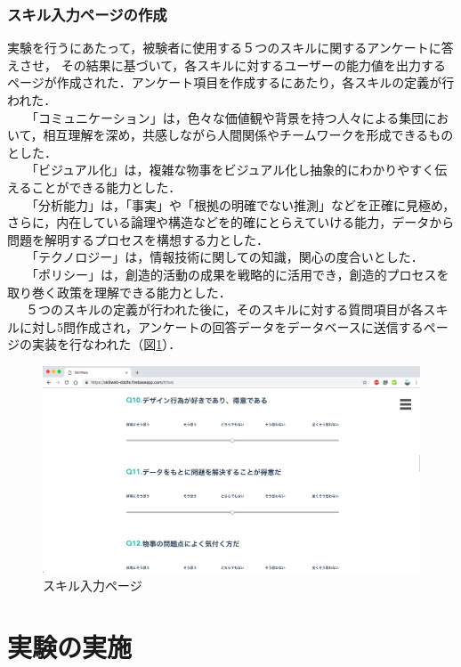 \documentclass{funthesis}
\begin{document}
\subsubsection{スキル入力ページの作成}
実験を行うにあたって，被験者に使用する５つのスキルに関するアンケートに答えさせ，
その結果に基づいて，各スキルに対するユーザーの能力値を出力するページが作成された．アンケート項目を作成するにあたり，各スキルの定義が行われた．\\
\ \ \ 「コミュニケーション」は，色々な価値観や背景を持つ人々による集団において，相互理解を深め，共感しながら人間関係やチームワークを形成できるものとした．\\
\ \ \ 「ビジュアル化」は，複雑な物事をビジュアル化し抽象的にわかりやすく伝えることができる能力とした．\\
\ \ \ 「分析能力」は，「事実」や「根拠の明確でない推測」などを正確に見極め，さらに，内在している論理や構造などを的確にとらえていける能力，データから問題を解明するプロセスを構想する力とした．\\
\ \ \ 「テクノロジー」は，情報技術に関しての知識，関心の度合いとした．\\
\ \ \ 「ポリシー」は，創造的活動の成果を戦略的に活用でき，創造的プロセスを取り巻く政策を理解できる能力とした．\\
\ \ \ ５つのスキルの定義が行われた後に，そのスキルに対する質問項目が各スキルに対し5問作成され，アンケートの回答データをデータベースに送信するページの実装を行なわれた（図\ref{testtest}）．

\begin{figure}[h]
 \centering
   \includegraphics[width=150mm]{figures/test.png}
 \caption{スキル入力ページ}
 \label{testtest}
\end{figure}

\section{実験の実施}
\end{document}
